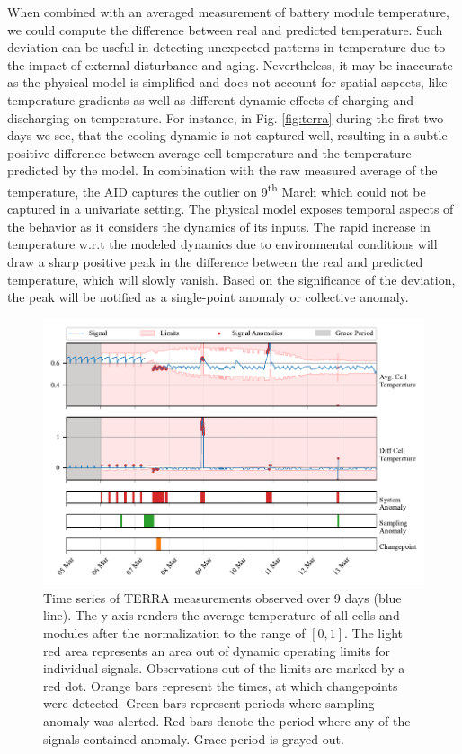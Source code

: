 When combined with an averaged measurement of battery module temperature, we could compute the difference between real and predicted temperature. Such deviation can be useful in detecting unexpected patterns in temperature due to the impact of external disturbance and aging. Nevertheless, it may be inaccurate as the physical model is simplified and does not account for spatial aspects, like temperature gradients as well as different dynamic effects of charging and discharging on temperature. For instance, in Fig. \ref{fig:terra} during the first two days we see, that the cooling dynamic is not captured well, resulting in a subtle positive difference between average cell temperature and the temperature predicted by the model. In combination with the raw measured average of the temperature, the AID captures the outlier on 9\textsuperscript{th} March which could not be captured in a univariate setting. The physical model exposes temporal aspects of the behavior as it considers the dynamics of its inputs. The rapid increase in temperature w.r.t the modeled dynamics due to environmental conditions will draw a sharp positive peak in the difference between the real and predicted temperature, which will slowly vanish. Based on the significance of the deviation, the peak will be notified as a single-point anomaly or collective anomaly.

\begin{figure}[htbp]
\centerline{\includegraphics{figures/TERRA_thresh_4days.pdf}}
\caption{Time series of TERRA measurements observed over 9 days (blue line). The y-axis renders the average temperature of all cells and modules after the normalization to the range of $[0, 1]$. The light red area represents an area out of dynamic operating limits for individual signals. Observations out of the limits are marked by a red dot. Orange bars represent the times, at which changepoints were detected. Green bars represent periods where sampling anomaly was alerted. Red bars denote the period where any of the signals contained anomaly. Grace period is grayed out.}
\label{fig:terra_multi}
\end{figure}

